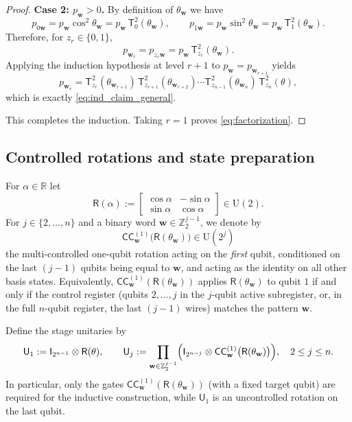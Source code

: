 \documentclass{article}
\newcommand{\CC}{\mathsf{C}\mathsf{C}}
\newcommand{\rI}{\mathsf{I}}
\newcommand{\rR}{\mathsf{R}}
\newcommand{\rU}{\mathsf{U}}
\numberwithin{equation}{section}
\begin{document}
\begin{proof}
\smallskip
\noindent\textbf{Case 2: $p_{\mathbf{w}}>0$.}
By definition of $\theta_{\mathbf{w}}$ we have
\[
p_{0\mathbf{w}}=p_{\mathbf{w}}\cos^2\theta_{\mathbf{w}}=p_{\mathbf{w}}\,\mathsf{T}_0^2(\theta_{\mathbf{w}}),
\qquad
p_{1\mathbf{w}}=p_{\mathbf{w}}\sin^2\theta_{\mathbf{w}}=p_{\mathbf{w}}\,\mathsf{T}_1^2(\theta_{\mathbf{w}}).
\]
Therefore, for $z_r\in\{0,1\}$,
\[
p_{\mathbf{w}_r}=p_{z_r \mathbf{w}}=p_{\mathbf{w}}\,\mathsf{T}_{z_r}^2(\theta_{\mathbf{w}}).
\]
Applying the induction hypothesis at level $r+1$ to $p_{\mathbf{w}}=p_{\mathbf{w}_{r+1}}$ yields
\[
p_{\mathbf{w}_r}
=\mathsf{T}_{z_r}^2(\theta_{\mathbf{w}_{r+1}})\,
\mathsf{T}_{z_{r+1}}^2(\theta_{\mathbf{w}_{r+2}})\cdots
\mathsf{T}_{z_{n-1}}^2(\theta_{\mathbf{w}_n})\,
\mathsf{T}_{z_n}^2(\theta),
\]
which is exactly \eqref{eq:ind_claim_general}.

\smallskip
This completes the induction. Taking $r=1$ proves \eqref{eq:factorization}.
\end{proof}


\subsection{Controlled rotations and state preparation}\label{subsec:controlled_rotations}

For $\alpha\in\mathbb{R}$ let
\[
\rR(\alpha):=\begin{bmatrix}\cos\alpha&-\sin\alpha\\ \sin\alpha&\cos\alpha\end{bmatrix}\in \mathrm{U}(2).
\]
For $j\in\{2,\dots,n\}$ and a binary word $\mathbf{w}\in\mathbb{Z}_2^{j-1}$, we denote by
\[
\CC_{\mathbf{w}}^{(1)}\bigl(\rR(\theta_{\mathbf{w}})\bigr)\in \mathrm{U}(2^j)
\]
the multi-controlled one-qubit rotation acting on the \emph{first} qubit, conditioned on the last
$(j-1)$ qubits being equal to $\mathbf{w}$, and acting as the identity on all other basis states. Equivalently,
$\CC_{\mathbf{w}}^{(1)}(\rR(\theta_{\mathbf{w}}))$ applies $\rR(\theta_{\mathbf{w}})$ to qubit $1$ if and only if the control register
(qubits $2,\dots,j$ in the $j$-qubit active subregister, or, in the full $n$-qubit register, the last
$(j-1)$ wires) matches the pattern $\mathbf{w}$.

Define the stage unitaries by
\[
\rU_1 := \rI_{2^{n-1}}\otimes \rR(\theta),
\qquad
\rU_j := \prod_{\mathbf{w}\in\mathbb{Z}_2^{j-1}}\Bigl(\rI_{2^{n-j}}\otimes \CC_{\mathbf{w}}^{(1)}\bigl(\rR(\theta_{\mathbf{w}})\bigr)\Bigr),
\quad 2\le j\le n.
\]
In particular, only the gates $\CC_{\mathbf{w}}^{(1)}(\rR(\theta_{\mathbf{w}}))$ (with a fixed target qubit) are required for
the inductive construction, while $\rU_1$ is an uncontrolled rotation on the last qubit.
\end{document}
